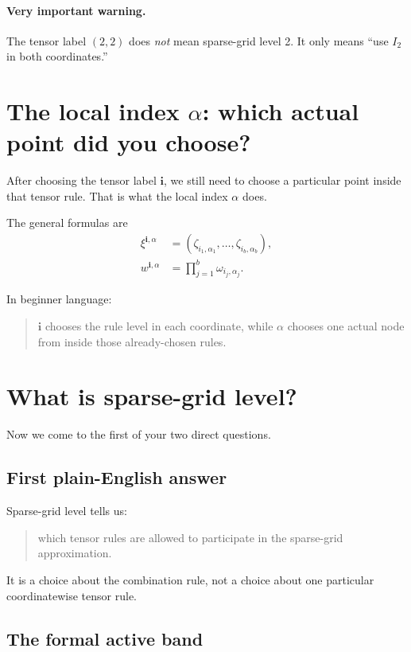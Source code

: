 \documentclass[11pt]{article}
\begin{document}
\paragraph{Very important warning.}
The tensor label \((2,2)\) does \emph{not} mean sparse-grid level 2.  It only
means ``use \(I_2\) in both coordinates.''

\section{The local index \texorpdfstring{\(\alpha\)}{alpha}: which actual point did you choose?}
\label{sec:alpha}

After choosing the tensor label \(\mathbf i\), we still need to choose a
particular point inside that tensor rule.  That is what the local index
\(\alpha\) does.

The general formulas are
\begin{align}
  \xi^{\mathbf i,\alpha}
  &=
  (\zeta_{i_1,\alpha_1},\ldots,\zeta_{i_b,\alpha_b}),
  \label{eq:xi-i-alpha}\\
  w^{\mathbf i,\alpha}
  &=
  \prod_{j=1}^b\omega_{i_j,\alpha_j}.
  \label{eq:w-i-alpha}
\end{align}

In beginner language:
\begin{quote}
\(\mathbf i\) chooses the rule level in each coordinate, while \(\alpha\) chooses
one actual node from inside those already-chosen rules.
\end{quote}

\section{What is sparse-grid level?}
\label{sec:what-is-sparse-grid-level}

Now we come to the first of your two direct questions.

\subsection{First plain-English answer}

Sparse-grid level tells us:
\begin{quote}
which tensor rules are allowed to participate in the sparse-grid approximation.
\end{quote}
It is a choice about the combination rule, not a choice about one particular
coordinatewise tensor rule.

\subsection{The formal active band}
\end{document}
